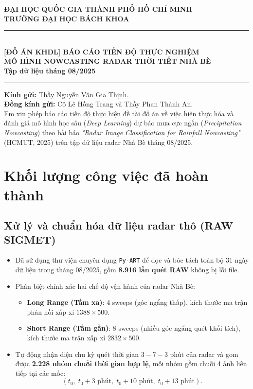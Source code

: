 \documentclass[12pt,a4paper]{article}
\begin{document}
\begin{center}
    {\large \textbf{ĐẠI HỌC QUỐC GIA THÀNH PHỐ HỒ CHÍ MINH}}\\[0.2cm]
    {\large \textbf{TRƯỜNG ĐẠI HỌC BÁCH KHOA}}\\[0.4cm]
    \rule{\textwidth}{1pt}\\[0.4cm]
    {\Large \textbf{[ĐỒ ÁN KHDL] BÁO CÁO TIẾN ĐỘ THỰC NGHIỆM}}\\[0.2cm]
    {\large \textbf{MÔ HÌNH NOWCASTING RADAR THỜI TIẾT NHÀ BÈ}}\\[0.2cm]
    {\normalsize \textbf{Tập dữ liệu tháng 08/2025}}\\[0.3cm]
    \rule{\textwidth}{1pt}
\end{center}

\vspace{0.3cm}
\noindent \textbf{Kính gửi:} Thầy Nguyễn Văn Gia Thịnh.\\
\noindent \textbf{Đồng kính gửi:} Cô Lê Hồng Trang và Thầy Phan Thành An.\\[0.2cm]
\noindent Em xin phép báo cáo tiến độ thực hiện đề tài đồ án về việc hiện thực hóa và đánh giá mô hình học sâu (\textit{Deep Learning}) dự báo mưa cực ngắn (\textit{Precipitation Nowcasting}) theo bài báo \textit{"Radar Image Classification for Rainfall Nowcasting"} (HCMUT, 2025) trên tập dữ liệu radar Nhà Bè tháng 08/2025.

\vspace{0.4cm}
\section{Khối lượng công việc đã hoàn thành}

\subsection{Xử lý và chuẩn hóa dữ liệu radar thô (RAW SIGMET)}
\begin{itemize}
    \item Đã sử dụng thư viện chuyên dụng \texttt{Py-ART} để đọc và bóc tách toàn bộ 31 ngày dữ liệu trong tháng 08/2025, gồm \textbf{8.916 lần quét RAW} không bị lỗi file.
    \item Phân biệt chính xác hai chế độ vận hành của radar Nhà Bè:
    \begin{itemize}
        \item \textbf{Long Range (Tầm xa)}: 4 sweeps (góc ngẩng thấp), kích thước ma trận phản hồi xấp xỉ $1388 \times 500$.
        \item \textbf{Short Range (Tầm gần)}: 8 sweeps (nhiều góc ngẩng quét khối tích), kích thước ma trận xấp xỉ $2832 \times 500$.
    \end{itemize}
    \item Tự động nhận diện chu kỳ quét thời gian $3 - 7 - 3$ phút của radar và gom được \textbf{2.228 nhóm chuỗi thời gian hợp lệ}, mỗi nhóm gồm chuỗi 4 ảnh liên tiếp tại các mốc:
    \[
        (t_0,\; t_0 + 3\text{ phút},\; t_0 + 10\text{ phút},\; t_0 + 13\text{ phút}).
    \]
\end{itemize}
\end{document}
